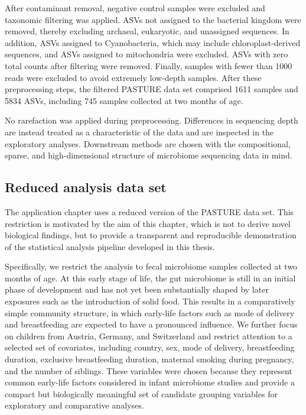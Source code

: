 After contaminant removal, negative control samples were excluded and taxonomic filtering was applied. ASVs not assigned to the bacterial kingdom were removed, thereby excluding archaeal, eukaryotic, and unassigned sequences. In addition, ASVs assigned to Cyanobacteria, which may include chloroplast-derived sequences, and ASVs assigned to mitochondria were excluded. ASVs with zero total counts after filtering were removed. Finally, samples with fewer than 1000 reads were excluded to avoid extremely low-depth samples. After these preprocessing steps, the filtered PASTURE data set comprised 1611 samples and 5834 ASVs, including 745 samples collected at two months of age. 

No rarefaction was applied during preprocessing. Differences in sequencing depth are instead treated as a characteristic of the data and are inspected in the exploratory analyses. Downstream methods are chosen with the compositional, sparse, and high-dimensional structure of microbiome sequencing data in mind.

\subsection{Reduced analysis data set}
\label{sec:7app:reduced_data}

The application chapter uses a reduced version of the PASTURE data set. This restriction is motivated by the aim of this chapter, which is not to derive novel biological findings, but to provide a transparent and reproducible demonstration of the statistical analysis pipeline developed in this thesis.

Specifically, we restrict the analysis to fecal microbiome samples collected at two months of age. At this early stage of life, the gut microbiome is still in an initial phase of development and has not yet been substantially shaped by later exposures such as the introduction of solid food. This results in a comparatively simple community structure, in which early-life factors such as mode of delivery and breastfeeding are expected to have a pronounced influence. We further focus on children from Austria, Germany, and Switzerland and restrict attention to a selected set of covariates, including country, sex, mode of delivery, breastfeeding duration, exclusive breastfeeding duration, maternal smoking during pregnancy, and the number of siblings. These variables were chosen because they represent common early-life factors considered in infant microbiome studies and provide a compact but biologically meaningful set of candidate grouping variables for exploratory and comparative analyses.

